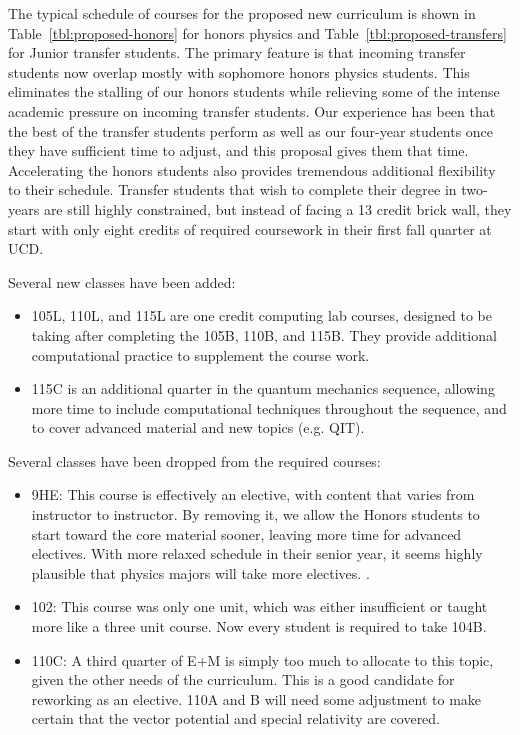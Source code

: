 \documentclass[12pt]{article}
\begin{document}
The typical schedule of courses for the proposed new curriculum is shown in Table~\ref{tbl:proposed-honors} for honors physics and Table~\ref{tbl:proposed-transfers} for Junior transfer students.
The primary feature is that incoming transfer students now overlap mostly with sophomore honors physics students.  This eliminates the stalling of our honors students while relieving some of the intense academic pressure on incoming transfer students.  Our experience has been that the best of the transfer students perform as well as our four-year students once they have sufficient time to adjust, and this proposal gives them that time.  Accelerating the honors students also provides tremendous additional flexibility to their schedule.  Transfer students that wish to complete their degree in two-years are still highly constrained, but instead of facing a 13 credit brick wall, they start with only eight credits of required coursework in their first fall quarter at UCD.

Several new classes have been added:
\begin{itemize}
\item 105L, 110L, and 115L are one credit computing lab courses, designed to be taking after completing the 105B, 110B, and 115B. They provide additional computational practice to supplement the course work.
\item 115C is an additional quarter in the quantum mechanics sequence, allowing more time to include computational techniques throughout the sequence, and to cover advanced material and new topics (e.g. QIT). 
\end{itemize}

Several classes have been dropped from the required courses:
\begin{itemize}
\item 9HE:  This course is effectively an elective, with content that varies from instructor to instructor.  By removing it, we allow the Honors students to start toward the core material sooner, leaving more time for advanced electives. With more relaxed schedule in their senior year, it seems highly plausible that physics majors will take more electives.  
.
\item 102:  This course was only one unit, which was either insufficient or taught more like a three unit course.  Now every student is required to take 104B.
\item 110C:  A third quarter of E+M is simply too much to allocate to this topic, given the other needs of the curriculum.   This is a good candidate for reworking as an elective.  110A and B will need some adjustment to make certain that the vector potential and special relativity are covered.
\end{itemize}
\end{document}
